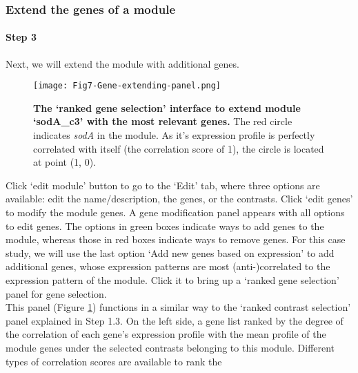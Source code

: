 \subsubsection{Extend the genes of a module}

\begin{small} %

\paragraph{Step 3} Next, we will extend the module with additional genes.
%
\begin{figure}[b]
	\centering
  	\texttt{[image: Fig7-Gene-extending-panel.png]}
	\caption[COLOMBOS `ranked gene selection' interface]{
	\textbf{The `ranked gene selection' interface to extend module `sodA\_c3' 
	with the most relevant genes.} 
	The red circle indicates \textit{sodA} in the module. As it's expression 
	profile is perfectly correlated with itself (the correlation score of 1), 
	the circle is located at point (1, 0).}
	\label{fig:colombos-gene-extend}
\end{figure}
%
Click `edit module' button to go to the `Edit' tab, where three options are
available: edit the name/description, the genes, or the contrasts. Click `edit
genes' to modify the module genes. A gene modification panel appears with all
options to edit genes.  The options in green boxes indicate ways to add genes
to the module, whereas those in red boxes indicate ways to remove genes. 
%
For this case study, we will use the last option `Add new genes based on
expression' to add additional genes, whose expression patterns are most
(anti-)correlated to the expression pattern of the module.  Click it to bring
up a `ranked gene selection' panel for gene selection.
\\
This panel (Figure \ref{fig:colombos-gene-extend}) functions in a similar way 
to the `ranked contrast selection' panel explained in Step 1.3. 
%
On the left side, a gene list ranked by the degree of the correlation of each
gene's expression profile with the mean profile of the module genes under the
selected contrasts belonging to this module.  
%
Different types of correlation scores are available to rank the

\end{small}
